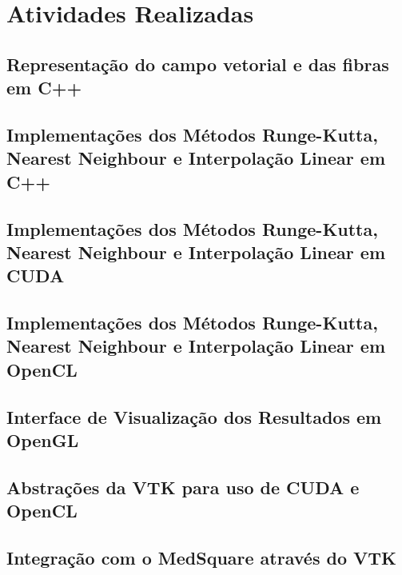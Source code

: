 \chapter{Atividades Realizadas}

\section{Representação do campo vetorial e das fibras em C++}
\section{Implementações dos Métodos Runge-Kutta, Nearest Neighbour e Interpolação Linear em C++}
\section{Implementações dos Métodos Runge-Kutta, Nearest Neighbour e Interpolação Linear em CUDA}
\section{Implementações dos Métodos Runge-Kutta, Nearest Neighbour e Interpolação Linear em OpenCL}
\section{Interface de Visualização dos Resultados em OpenGL}
\section{Abstrações da VTK para uso de CUDA e OpenCL}
\section{Integração com o MedSquare através do VTK}
